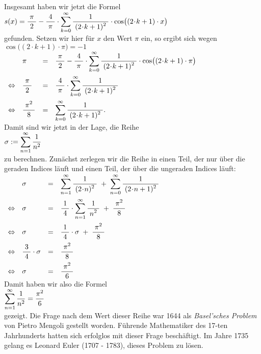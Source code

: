 Insgesamt haben wir jetzt die Formel 
\\[0.3cm]
\hspace*{1.3cm}
$\displaystyle s(x) = \displaystyle\frac{\;\displaystyle\pi\;}{\;\displaystyle2\;} - \displaystyle\frac{\;\displaystyle4\;}{\;\displaystyle\pi\;} \cdot\sum\limits_{k=0}^\infty \displaystyle\frac{\;\displaystyle1\;}{\;\displaystyle(2\!\cdot\!k+1)^2\;} \cdot \cos\bigl((2\!\cdot\!k+1)\cdot x\bigr)$
\\[0.3cm]
gefunden.  Setzen wir hier f\"ur $x$ den Wert $\pi$ ein, so ergibt sich wegen $\cos\bigl((2\!\cdot\!k+1)\cdot \pi\bigr) = - 1$
\\[0.1cm]
\hspace*{1.3cm}
$
\begin{array}[t]{clcl}
                & \pi & = & \bruch{\pi}{2} - \bruch{4}{\pi} \cdot\sum\limits_{k=0}^\infty \bruch{1}{(2\!\cdot\!k+1)^2} \cdot \cos\bigl((2\!\cdot\!k+1)\cdot \pi\bigr) \\[0.5cm]
\Leftrightarrow & \bruch{\pi}{2} & = &  \bruch{4}{\pi} \cdot\sum\limits_{k=0}^\infty \bruch{1}{(2\!\cdot\!k+1)^2} \\[0.5cm]
\Leftrightarrow & \bruch{\pi^2}{8} & = & \displaystyle \sum\limits_{k=0}^\infty \bruch{1}{(2\!\cdot\!k+1)^2}.
\end{array}
$
\\[0.3cm]
Damit sind wir jetzt in der Lage, die Reihe 
\\[0.2cm]
\hspace*{1.3cm}
$\displaystyle \sigma := \sum\limits_{n=1}^\infty \frac{1}{n^2}$
\\[0.2cm]
zu berechnen.  Zun\"achst zerlegen wir die Reihe in einen Teil, der nur \"uber die geraden Indices 
l\"auft und einen Teil, der \"uber die ungeraden Indices l\"auft: 
\\[0.3cm]
\hspace*{1.3cm}
$
\begin{array}[t]{clcl}
                & \sigma & = & \displaystyle 
                  \sum\limits_{n=1}^\infty \displaystyle\frac{\;\displaystyle1\;}{\;\displaystyle(2\!\cdot\!n)^2\;} \;+\; \sum\limits_{n=0}^\infty \displaystyle\frac{\;\displaystyle1\;}{\;\displaystyle(2\!\cdot\!n+1)^2\;} \\[0.5cm]
\Leftrightarrow & \sigma & = & \displaystyle 
                  \displaystyle\frac{\;\displaystyle1\;}{\;\displaystyle4\;}\cdot\sum\limits_{n=1}^\infty \displaystyle\frac{\;\displaystyle1\;}{\;\displaystyle n^2\;} \;+\; \displaystyle\frac{\;\displaystyle\pi^2\;}{\;\displaystyle8\;} \\[0.5cm]
\Leftrightarrow & \sigma & = & \displaystyle \displaystyle\frac{\;\displaystyle1\;}{\;\displaystyle4\;} \cdot \sigma  \;+\; \displaystyle\frac{\;\displaystyle\pi^2\;}{\;\displaystyle8\;} \\[0.3cm]
\Leftrightarrow & \displaystyle\frac{\;\displaystyle3\;}{\;\displaystyle4\;}\cdot\sigma & = & \displaystyle\frac{\;\displaystyle\pi^2\;}{\;\displaystyle8\;} \\[0.3cm]
\Leftrightarrow & \sigma & = & \displaystyle\frac{\;\displaystyle\pi^2\;}{\;\displaystyle6\;} 
\end{array}
$
\\[0.3cm]
Damit haben wir also die Formel 
\\[0.3cm]
\hspace*{1.3cm} $\displaystyle\sum\limits_{n=1}^\infty \frac{1}{n^2} = \frac{\pi^2}{6}$
\\[0.3cm]
gezeigt.  Die Frage nach dem Wert dieser Reihe war 1644 als \emph{Basel'sches Problem} von
Pietro Mengoli gestellt worden. 
F\"uhrende Mathematiker des 17-ten Jahrhunderts hatten sich erfolglos mit dieser Frage
besch\"aftigt.
Im Jahre 1735 gelang es Leonard Euler (1707 - 1783), dieses Problem zu l\"osen.

